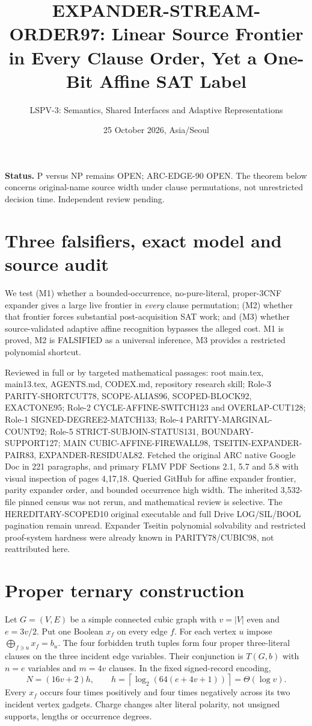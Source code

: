 \documentclass[11pt]{article}
\title{EXPANDER-STREAM-ORDER97: Linear Source Frontier in Every Clause Order, Yet a One-Bit Affine SAT Label}
\author{LSPV-3: Semantics, Shared Interfaces and Adaptive Representations}
\date{25 October 2026, Asia/Seoul}
\begin{document}
\maketitle
\noindent\textbf{Status.} P versus NP remains OPEN; ARC-EDGE-90 OPEN. The theorem below concerns original-name source width under clause permutations, not unrestricted decision time. Independent review pending.

\section{Three falsifiers, exact model and source audit}
We test (M1) whether a bounded-occurrence, no-pure-literal, proper-3CNF expander gives a large live frontier in \emph{every} clause permutation; (M2) whether that frontier forces substantial post-acquisition SAT work; and (M3) whether source-validated adaptive affine recognition bypasses the alleged cost. M1 is proved, M2 is FALSIFIED as a universal inference, M3 provides a restricted polynomial shortcut.

Reviewed in full or by targeted mathematical passages: root main.tex, main13.tex, AGENTS.md, CODEX.md, repository research skill; Role-3 PARITY-SHORTCUT78, SCOPE-ALIAS96, SCOPED-BLOCK92, EXACTONE95; Role-2 CYCLE-AFFINE-SWITCH123 and OVERLAP-CUT128; Role-1 SIGNED-DEGREE2-MATCH133; Role-4 PARITY-MARGINAL-COUNT92; Role-5 STRICT-SUBJOIN-STATUS131, BOUNDARY-SUPPORT127; MAIN CUBIC-AFFINE-FIREWALL98, TSEITIN-EXPANDER-PAIR83, EXPANDER-RESIDUAL82. Fetched the original ARC native Google Doc in 221 paragraphs, and primary FLMV PDF Sections 2.1, 5.7 and 5.8 with visual inspection of pages 4,17,18. Queried GitHub for affine expander frontier, parity expander order, and bounded occurrence high width. The inherited 3,532-file pinned census was not rerun, and mathematical review is selective. The HEREDITARY-SCOPED10 original executable and full Drive LOG/SIL/BOOL pagination remain unread. Expander Tseitin polynomial solvability and restricted proof-system hardness were already known in PARITY78/CUBIC98, not reattributed here.

\section{Proper ternary construction}
Let $G=(V,E)$ be a simple connected cubic graph with $v=|V|$ even and $e=3v/2$. Put one Boolean $x_f$ on every edge $f$. For each vertex $u$ impose $\bigoplus_{f\ni u}x_f=b_u$. The four forbidden truth tuples form four proper three-literal clauses on the three incident edge variables. Their conjunction is $T(G,b)$ with $n=e$ variables and $m=4v$ clauses. In the fixed signed-record encoding,
\[
N=(16v+2)h,\qquad h=\left\lceil\log_2(64(e+4v+1))\right\rceil=\Theta(\log v).
\]
Every $x_f$ occurs four times positively and four times negatively across its two incident vertex gadgets. Charge changes alter literal polarity, not unsigned supports, lengths or occurrence degrees.
\end{document}
